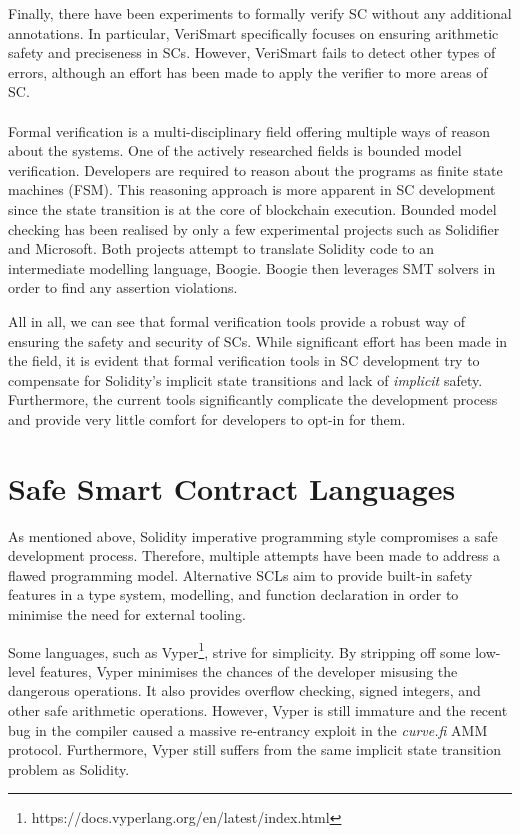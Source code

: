 \documentclass[oneside]{ecsproject}     %
\begin{document}
Finally, there have been experiments to formally verify SC without any additional annotations. In particular, VeriSmart specifically
focuses on ensuring arithmetic safety and preciseness in SCs\cite{so2019verismart}. However, VeriSmart fails to detect other types of errors, 
although an effort has been made to apply the verifier to more areas of SC.

\paragraph*{}
Formal verification is a multi-disciplinary field offering multiple ways of reason about the systems. One of the actively researched fields
is bounded model verification\cite{SMBC}. Developers are required to reason about the programs as finite state machines (FSM).
This reasoning approach is more apparent in SC development since the state transition is at the core of blockchain execution.
Bounded model checking has been realised by only a few experimental projects such as Solidifier\cite{solidifer} and Microsoft\cite{azure}.
Both projects attempt to translate Solidity code to an intermediate modelling language, Boogie\cite{boogie}. Boogie then leverages
SMT solvers in order to find any assertion violations.

All in all, we can see that formal verification tools provide a robust way of ensuring the safety and security of SCs. 
While significant effort has been made in the field, it is evident that formal verification tools in SC development
try to compensate for Solidity's implicit state transitions and lack of \textit{implicit} safety. 
Furthermore, the current tools significantly complicate the development process and provide very little comfort
for developers to opt-in for them.

\section{Safe Smart Contract Languages} \label{Chapter:SCL}

As mentioned above, Solidity imperative programming style compromises a safe development process. Therefore,
multiple attempts have been made to address a flawed programming model\cite{sc_survey}. Alternative SCLs aim to provide
built-in safety features in a type system, modelling, and function declaration in order to minimise the need for
external tooling. 

Some languages, such as Vyper\footnote{https://docs.vyperlang.org/en/latest/index.html}, strive for simplicity.
By stripping off some low-level features, Vyper minimises the chances of the developer misusing the dangerous operations.
It also provides overflow checking, signed integers, and other safe arithmetic operations. However, Vyper is still immature 
and the recent bug in the compiler caused a massive re-entrancy exploit in the \textit{curve.fi} AMM protocol\cite{curve}.
Furthermore, Vyper still suffers from the same implicit state transition problem as Solidity.
\end{document}
